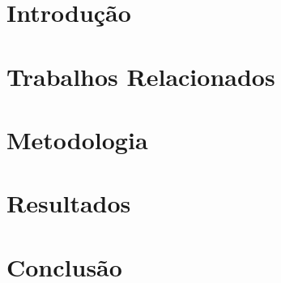 \documentclass[sigconf]{acmart}
\begin{document}




\maketitle

\section{Introdu\c{c}\~ao}


\section{Trabalhos Relacionados}


\section{Metodologia}


\section{Resultados}


% 

% 

\section{Conclus\~ao}


% 


 
\end{document}
